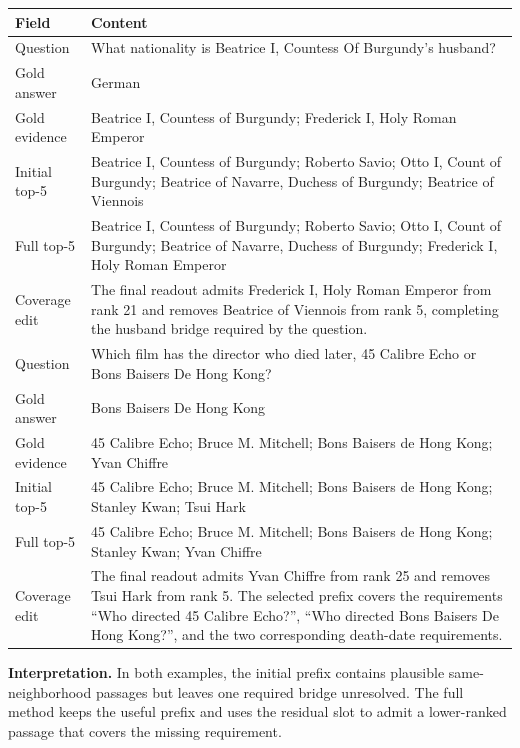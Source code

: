 \begin{center}
\centering
\scriptsize
\setlength{\tabcolsep}{3pt}
\begin{tabular}{p{}p{}}
\toprule
Field & Content \\
\midrule
Question
& What nationality is Beatrice I, Countess Of Burgundy's husband? \\
Gold answer
& German \\
Gold evidence
& Beatrice I, Countess of Burgundy; Frederick I, Holy Roman Emperor \\
Initial top-5
& Beatrice I, Countess of Burgundy; Roberto Savio; Otto I, Count of Burgundy; Beatrice of Navarre, Duchess of Burgundy; Beatrice of Viennois \\
Full \methodname{} top-5
& Beatrice I, Countess of Burgundy; Roberto Savio; Otto I, Count of Burgundy; Beatrice of Navarre, Duchess of Burgundy; Frederick I, Holy Roman Emperor \\
Coverage edit
& The final readout admits Frederick I, Holy Roman Emperor from rank 21 and removes Beatrice of Viennois from rank 5, completing the husband bridge required by the question. \\
\midrule
Question
& Which film has the director who died later, 45 Calibre Echo or Bons Baisers De Hong Kong? \\
Gold answer
& Bons Baisers De Hong Kong \\
Gold evidence
& 45 Calibre Echo; Bruce M. Mitchell; Bons Baisers de Hong Kong; Yvan Chiffre \\
Initial top-5
& 45 Calibre Echo; Bruce M. Mitchell; Bons Baisers de Hong Kong; Stanley Kwan; Tsui Hark \\
Full \methodname{} top-5
& 45 Calibre Echo; Bruce M. Mitchell; Bons Baisers de Hong Kong; Stanley Kwan; Yvan Chiffre \\
Coverage edit
& The final readout admits Yvan Chiffre from rank 25 and removes Tsui Hark from rank 5. The selected prefix covers the requirements ``Who directed 45 Calibre Echo?'', ``Who directed Bons Baisers De Hong Kong?'', and the two corresponding death-date requirements. \\
\bottomrule
\end{tabular}
\end{center}

\noindent\textbf{Interpretation.}
In both examples, the initial prefix contains plausible same-neighborhood
passages but leaves one required bridge unresolved. The full method
keeps the useful prefix and uses the residual slot to admit a lower-ranked
passage that covers the missing requirement.

